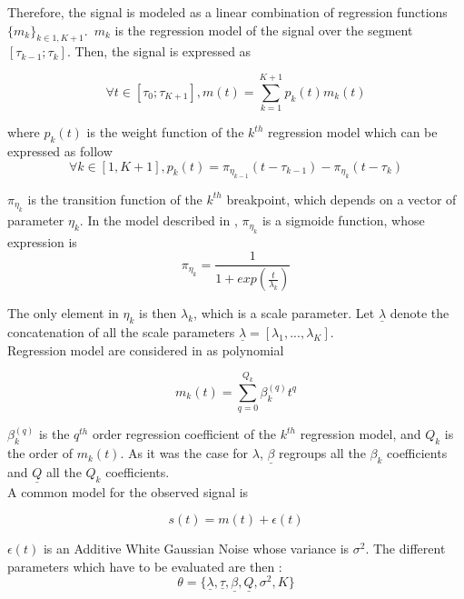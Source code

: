  Therefore, the signal is modeled as a linear combination of regression functions $\{m_k\}_{k\in{1,K+1}}$.~$m_k$ is the regression model of the signal over the segment $[\tau_{k-1};\tau_{k}]$. Then, the signal is expressed as

\begin{equation}
\forall t\in [\tau_0;\tau_{K+1}],m(t)= \sum_{k=1}^{K+1}p_k(t)m_k(t)
\end{equation}

where $p_k(t)$ is the weight function of the $k^{th}$ regression model which can be expressed as follow
\begin{equation}
\forall k\in [1,K+1], p_k(t)= \pi_{\eta_{k-1}}(t-\tau_{k-1})-\pi_{\eta_{k}}(t-\tau_{k})
\end{equation}

$\pi_{\eta_{k}}$ is the transition function of the $k^{th}$ breakpoint, which depends on a vector of parameter $\eta_{k}$. In the model described in \cite{research2}, $\pi_{\eta_{k}}$ is a sigmoide function, whose expression is
\begin{equation}
\pi_{\eta_{k}} = \frac{1}{1+exp(\frac{t}{\lambda_k})}
\end{equation}

The only element in $\eta_{k}$ is then $\lambda_k$, which is a scale parameter. Let $\underline{\lambda}$ denote the concatenation of all the scale parameters $\underline{\lambda} = [\lambda_1,...,\lambda_K]$.
\\

 Regression model are considered in \cite{research2} as polynomial

\begin{equation}
m_k(t)= \sum_{q=0}^{Q_k} \beta^{(q)} _kt^q
\end{equation}

$\beta^{(q)} _k$ is the $q^{th}$ order regression coefficient of the $k^{th}$ regression model, and $Q_k$ is the order of $m_k(t)$. As it was the case for $\lambda$, $\underline{\beta}$ regroups all the $\beta_k$ coefficients and $\underline{Q}$ all the $Q_k$ coefficients.
\\

A common model for the observed signal is


\begin{equation}
s(t)=m(t) + \epsilon (t)
\end{equation}

$\epsilon (t)$ is an Additive White Gaussian Noise whose variance is $\sigma^2$. The different parameters which have to be evaluated are then :
\begin{equation}
\theta=\{\underline{\lambda},\underline{\tau},\underline{\beta},\underline{Q},\sigma ^2,K\}
\end{equation}
\\


